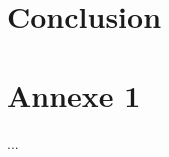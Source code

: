 \documentclass[a4paper,11pt,twoside]{report}
\begin{document}
\chapter{Conclusion}

  
\nocite{*} 

%
\cleardoublepage

\appendix

\chapter{Annexe 1}
...
\end{document}

